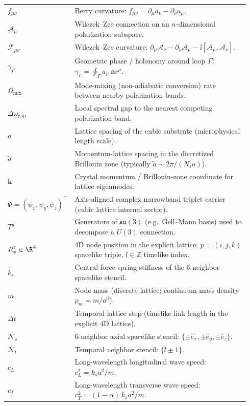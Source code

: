 \begin{center}
\begin{tabular}{p{0.22\linewidth} p{0.72\linewidth}}
$f_{\mu\nu}$ & Berry curvature: $f_{\mu\nu}=\partial_\mu a_\nu-\partial_\nu a_\mu$.\\
$\mathcal{A}_\mu$ & Wilczek--Zee connection on an $n$-dimensional polarization subspace.\\
$\mathcal{F}_{\mu\nu}$ & Wilczek--Zee curvature: $\partial_\mu\mathcal{A}_\nu-\partial_\nu\mathcal{A}_\mu-\ii[\mathcal{A}_\mu,\mathcal{A}_\nu]$.\\
$\gamma_\Gamma$ & Geometric phase / holonomy around loop $\Gamma$: $\gamma_\Gamma=\oint_\Gamma a_\mu\,\dd x^\mu$.\\
$\Omega_{\mathrm{mix}}$ & Mode-mixing (non-adiabatic conversion) rate between nearby polarization bands.\\
$\Delta\omega_{\mathrm{gap}}$ & Local spectral gap to the nearest competing polarization band.\\
$a$ & Lattice spacing of the cubic substrate (microphysical length scale).\\
$\tilde a$ & Momentum-lattice spacing in the discretized Brillouin zone (typically $\tilde a\sim 2\pi/(N_sa)$).\\
$\mathbf{k}$ & Crystal momentum / Brillouin-zone coordinate for lattice eigenmodes.\\
$\Psi=(\psi_x,\psi_y,\psi_z)^\top$ & Axis-aligned complex narrowband triplet carrier (cubic lattice internal sector).\\
$T^a$ & Generators of $\mathfrak{su}(3)$ (e.g.\ Gell--Mann basis) used to decompose a $U(3)$ connection.\\
$R_p^l\in\R^4$ & 4D node position in the explicit lattice: $p=(i,j,k)$ spacelike triple, $l\in\mathbb{Z}$ timelike index.\\
$k_s$ & Central-force spring stiffness of the 6-neighbor spacelike stencil.\\
$m$ & Node mass (discrete lattice; continuum mass density $\rho_m=m/a^3$).\\
$\Delta t$ & Temporal lattice step (timelike link length in the explicit 4D lattice).\\
$\mathcal{N}_s$ & 6-neighbor axial spacelike stencil: $\{\pm\hat{e}_x,\pm\hat{e}_y,\pm\hat{e}_z\}$.\\
$\mathcal{N}_t$ & Temporal neighbor stencil: $\{l\pm 1\}$.\\
$c_L$ & Long-wavelength longitudinal wave speed: $c_L^2=k_s a^2/m$.\\
$c_T$ & Long-wavelength transverse wave speed: $c_T^2=(1-\alpha)\,k_s a^2/m$.\\
\end{tabular}
\end{center}
